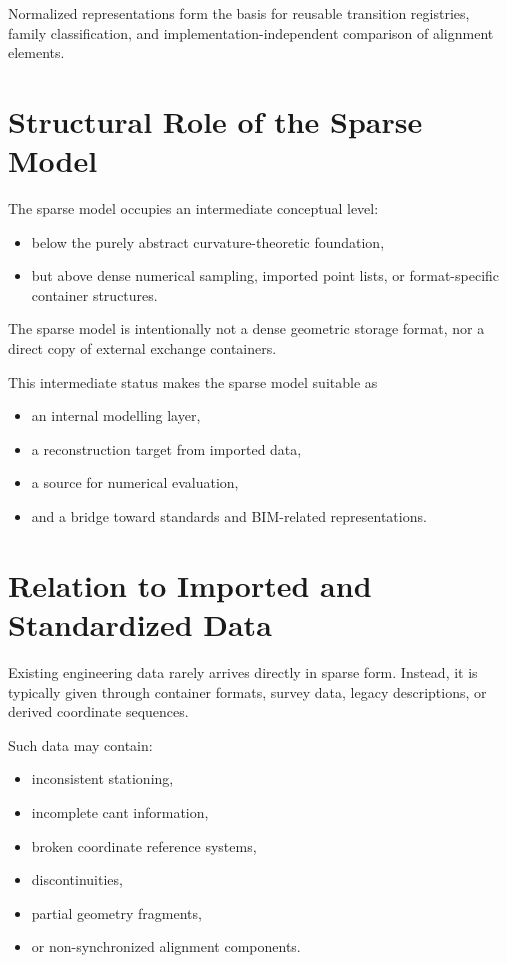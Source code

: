 Normalized representations form the basis for reusable transition
registries, family classification, and implementation-independent
comparison of alignment elements.

\section{Structural Role of the Sparse Model}

The sparse model occupies an intermediate conceptual level:
\begin{itemize}
  \item below the purely abstract curvature-theoretic foundation,
  \item but above dense numerical sampling, imported point lists, or
        format-specific container structures.
\end{itemize}

The sparse model is intentionally not a dense geometric storage format,
nor a direct copy of external exchange containers.

This intermediate status makes the sparse model suitable as
\begin{itemize}
  \item an internal modelling layer,
  \item a reconstruction target from imported data,
  \item a source for numerical evaluation,
  \item and a bridge toward standards and BIM-related representations.
\end{itemize}

\section{Relation to Imported and Standardized Data}

Existing engineering data rarely arrives directly in sparse form.
Instead, it is typically given through container formats, survey data,
legacy descriptions, or derived coordinate sequences.

Such data may contain:
\begin{itemize}
\item inconsistent stationing,
\item incomplete cant information,
\item broken coordinate reference systems,
\item discontinuities,
\item partial geometry fragments,
\item or non-synchronized alignment components.
\end{itemize}

